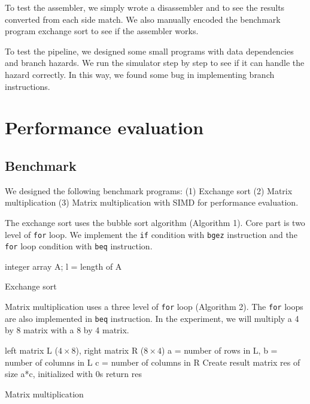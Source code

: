 \documentclass{sig-alternate}
\begin{document}
To test the assembler, we simply wrote a disassembler and to see the results converted from each side match. We also manually encoded the benchmark program exchange sort to see if the assembler works.
 
To test the pipeline, we designed some small programs with data dependencies and branch hazards. We run the simulator step by step to see if it can handle the hazard correctly. In this way, we found some bug in implementing branch instructions.

\section{Performance evaluation}
\subsection{Benchmark}
We designed the following benchmark programs: (1) Exchange sort (2) Matrix multiplication (3) Matrix multiplication with SIMD for performance evaluation. 

The exchange sort uses the bubble sort algorithm (Algorithm 1). Core part is two level of \texttt{for} loop. We implement the \texttt{if} condition with \texttt{bgez} instruction and the \texttt{for} loop condition with \texttt{beq} instruction.

\begin{algorithm}[h]
\SetAlgoLined
 integer array A; l = length of A\;
\caption{Exchange sort}
\end{algorithm}

Matrix multiplication uses a three level of \texttt{for} loop (Algorithm 2). The \texttt{for} loops are also implemented in \texttt{beq} instruction. In the experiment, we will multiply a 4 by 8 matrix with a 8 by 4 matrix.

\begin{algorithm}[h]
\SetAlgoLined
 left matrix L ($4 \times 8$), right matrix R ($8 \times 4$)\;
 a = number of rows in L, b = number of columns in L\;  
 c = number of columns in R\;
 Create result matrix res of size a*c, initialized with 0s\;
 return res\;
 \caption{Matrix multiplication}
\end{algorithm}
\end{document}
